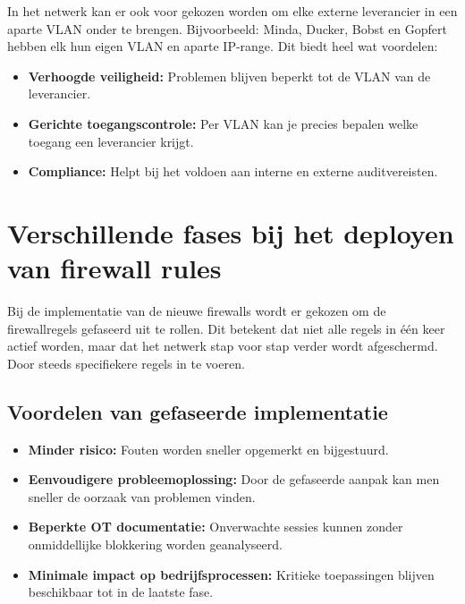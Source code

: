 In het netwerk kan er ook voor gekozen worden om elke externe leverancier in een aparte VLAN onder te brengen. Bijvoorbeeld: Minda, Ducker, Bobst en Gopfert hebben elk hun eigen VLAN en aparte IP-range. Dit biedt heel wat voordelen:

\begin{itemize}
    \item \textbf{Verhoogde veiligheid:} Problemen blijven beperkt tot de VLAN van de leverancier.
    \item \textbf{Gerichte toegangscontrole:} Per VLAN kan je precies bepalen welke toegang een leverancier krijgt.
    \item \textbf{Compliance:} Helpt bij het voldoen aan interne en externe auditvereisten.
\end{itemize}

\section{Verschillende fases bij het deployen van firewall rules}

Bij de implementatie van de nieuwe firewalls wordt er gekozen om de firewallregels gefaseerd uit te rollen. Dit betekent dat niet alle regels in één keer actief worden, maar dat het netwerk stap voor stap verder wordt afgeschermd. Door steeds specifiekere regels in te voeren.

\subsection*{Voordelen van gefaseerde implementatie}

\begin{itemize}
    \item \textbf{Minder risico:} Fouten worden sneller opgemerkt en bijgestuurd.
    \item \textbf{Eenvoudigere probleemoplossing:} Door de gefaseerde aanpak kan men sneller de oorzaak van problemen vinden.
    \item \textbf{Beperkte OT documentatie:} Onverwachte sessies kunnen zonder onmiddellijke blokkering worden geanalyseerd.
    \item \textbf{Minimale impact op bedrijfsprocessen:} Kritieke toepassingen blijven beschikbaar tot in de laatste fase.
\end{itemize}

